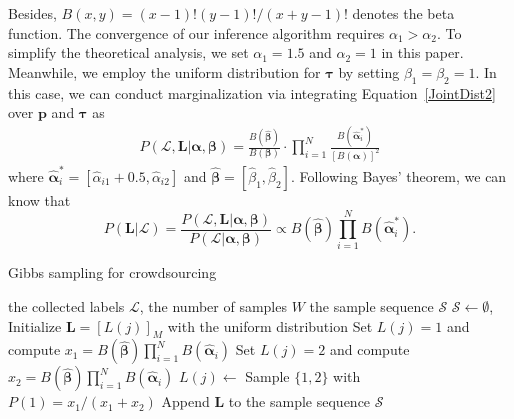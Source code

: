 \documentclass{article}
\begin{document}
Besides, $B(x,y)=(x-1)!(y-1)!/(x+y-1)!$ denotes the beta function.
The convergence of our inference algorithm requires $\alpha_1>\alpha_2$.
To simplify the theoretical analysis, we set $\alpha_1=1.5$ and $\alpha_2=1$ in this paper.
Meanwhile, we employ the uniform distribution for $\bm{\tau}$ by setting $\beta_1=\beta_2=1$.
In this case, we can conduct marginalization via integrating Equation~\ref{JointDist2} over $\bm{p}$ and $\bm{\tau}$ as
\begin{equation}
\label{marginalization}
\begin{split}
P(\mathcal{L},\bm{L}|\bm{\alpha}, \bm{\beta})=\frac{B(\hat{\bm{\beta}})}{B(\bm{\beta})}\cdot {\prod}_{i=1}^{N}\frac{B(\hat{\bm{\alpha}}^{*}_{i})}{[B(\bm{\alpha})]^2}
\end{split}
\end{equation}
where $\hat{\bm{\alpha}}^{*}_i=[\hat{\alpha}_{i1}+0.5,\hat{\alpha}_{i2}]$ and $\hat{\bm{\beta}}=[\hat{\beta}_1,\hat{\beta}_2]$. Following Bayes' theorem, we can know that
\begin{equation}
\label{PostDist}
P(\bm{L}|\mathcal{L})=\frac{P(\mathcal{L},\bm{L}|\bm{\alpha}, \bm{\beta})}{P(\mathcal{L}|\bm{\alpha}, \bm{\beta})}\propto B(\hat{\bm{\beta}})\prod_{i=1}^{N}B(\hat{\bm{\alpha}}^{*}_{i}). 
\end{equation}


\begin{algorithm}[tb]
   \caption{Gibbs sampling for crowdsourcing}
   \label{GSC}
   \small
\begin{algorithmic}[1]
   \vspace{0.5mm}
    the collected labels $\mathcal{L}$, the number of samples $W$
    the sample sequence $\mathcal{S}$
   \vspace{0.5mm}
   \STATE $\mathcal{S}\leftarrow\emptyset$, Initialize $\bm{L}=[L(j)]_M$ with the uniform distribution
   \STATE Set $L(j)=1$ and compute $x_1= B(\hat{\bm{\beta}})\prod_{i=1}^{N}B(\hat{\bm{\alpha}}_{i})$
   \STATE Set $L(j)=2$ and compute $x_2= B(\hat{\bm{\beta}})\prod_{i=1}^{N}B(\hat{\bm{\alpha}}_{i})$
   \STATE $L(j)\leftarrow$ Sample $\{1,2\}$ with $P(1)=x_1/(x_1+x_2)$
   \ENDFOR
   \STATE Append $\bm{L}$ to the sample sequence $\mathcal{S}$
   \ENDFOR
\end{algorithmic}
\end{algorithm}
\end{document}
